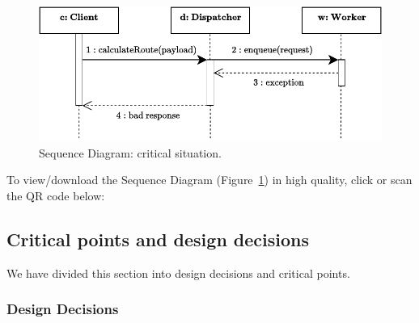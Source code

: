 \documentclass[a4paper]{article}
\begin{document}
    \begin{figure}[!htp]
        \centering
        \includegraphics[width=\textwidth]{img/sequence-diagram-4.pdf}
        \caption{Sequence Diagram: critical situation.}
        \label{fig: Sequence Diagram: critical situation}
    \end{figure}

    \noindent
    To view/download the Sequence Diagram (Figure~\ref{fig: Sequence Diagram: critical situation}) in high quality, click or scan the QR code below:
    \begin{center}
    \end{center}


    \newpage

    \subsection{Critical points and design decisions}\label{subsection: Critical points and design decisions}

    We have divided this section into design decisions and critical points.

    \subsubsection*{Design Decisions}
\end{document}
